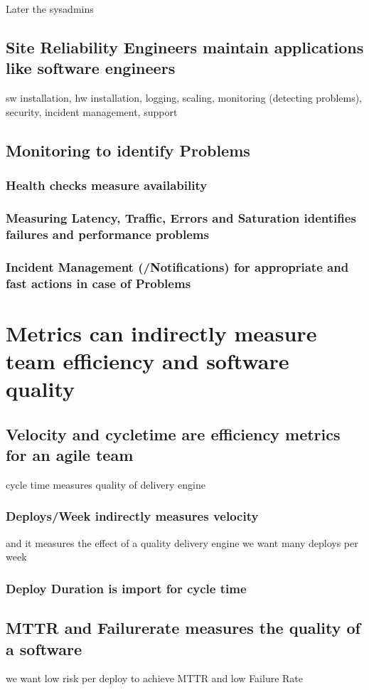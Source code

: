 Later the sysadmins


\section{Site Reliability Engineers maintain applications like software engineers}
sw installation, hw installation, logging, scaling, monitoring (detecting problems), security, incident management, support
\section{Monitoring to identify Problems}
\subsection{Health checks measure availability}
\subsection{Measuring Latency, Traffic, Errors and Saturation identifies failures and performance problems}
\subsection{Incident Management (/Notifications) for appropriate and fast actions in case of Problems}

\chapter{Metrics can indirectly measure team efficiency and software quality}
\section{Velocity and cycletime are efficiency metrics for an agile team}
cycle time measures quality of delivery engine
\subsection{Deploys/Week indirectly measures velocity}
and it measures the effect of a quality delivery engine
we want many deploys per week
\subsection{Deploy Duration is import for cycle time}
\section{MTTR and Failurerate measures the quality of a software}
we want low risk per deploy to achieve MTTR and low Failure Rate

